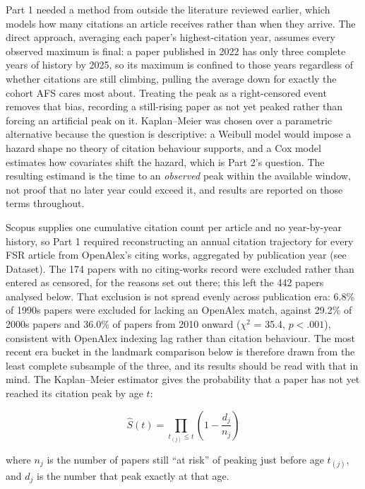 \documentclass[11pt,a4paper]{article}
\begin{document}
Part 1 needed a method from outside the literature reviewed earlier, which models how many citations an article receives rather than when they arrive. The direct approach, averaging each paper's highest-citation year, assumes every observed maximum is final: a paper published in 2022 has only three complete years of history by 2025, so its maximum is confined to those years regardless of whether citations are still climbing, pulling the average down for exactly the cohort AFS cares most about. Treating the peak as a right-censored event removes that bias, recording a still-rising paper as not yet peaked rather than forcing an artificial peak on it. Kaplan--Meier was chosen over a parametric alternative because the question is descriptive: a Weibull model would impose a hazard shape no theory of citation behaviour supports, and a Cox model estimates how covariates shift the hazard, which is Part 2's question. The resulting estimand is the time to an \textit{observed} peak within the available window, not proof that no later year could exceed it, and results are reported on those terms throughout.

Scopus supplies one cumulative citation count per article and no year-by-year history, so Part 1 required reconstructing an annual citation trajectory for every FSR article from OpenAlex's citing works, aggregated by publication year (see Dataset). The 174 papers with no citing-works record were excluded rather than entered as censored, for the reasons set out there; this left the 442 papers analysed below. That exclusion is not spread evenly across publication era: 6.8\% of 1990s papers were excluded for lacking an OpenAlex match, against 29.2\% of 2000s papers and 36.0\% of papers from 2010 onward (\(\chi^2\) = 35.4, \(p < .001\)), consistent with OpenAlex indexing lag rather than citation behaviour. The most recent era bucket in the landmark comparison below is therefore drawn from the least complete subsample of the three, and its results should be read with that in mind. The Kaplan--Meier estimator gives the probability that a paper has not yet reached its citation peak by age $t$:

\[\hat{S}(t) = \prod_{t_{(j)} \le t} \left(1 - \frac{d_j}{n_j}\right)\]

where \(n_j\) is the number of papers still ``at risk'' of peaking just before age \(t_{(j)}\), and \(d_j\) is the number that peak exactly at that age.
\end{document}
